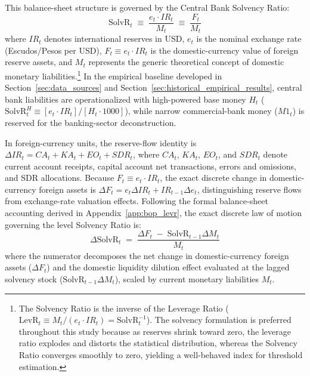 This balance-sheet structure is governed by the Central Bank Solvency Ratio:
\begin{equation}
	\text{SolvR}_t \;\equiv\; \frac{e_t \cdot IR_t}{M_t} \;\equiv\; \frac{F_t}{M_t}
	\label{eq:solvency_ratio}
\end{equation}
where $IR_t$ denotes international reserves in USD, $e_t$ is the nominal exchange rate (Escudos/Pesos per USD), $F_t \equiv e_t \cdot IR_t$ is the domestic-currency value of foreign reserve assets, and $M_t$ represents the generic theoretical concept of domestic monetary liabilities.\footnote{The Solvency Ratio is the inverse of the Leverage Ratio ($\text{LevR}_t \equiv M_t / (e_t \cdot IR_t) = \text{SolvR}_t^{-1}$). The solvency formulation is preferred throughout this study because as reserves shrink toward zero, the leverage ratio explodes and distorts the statistical distribution, whereas the Solvency Ratio converges smoothly to zero, yielding a well-behaved index for threshold estimation.} In the empirical baseline developed in Section~\ref{sec:data_sources} and Section~\ref{sec:historical_empirical_results}, central bank liabilities are operationalized with high-powered base money $H_t$ ($\text{SolvR}^H_t \equiv [e_t \cdot IR_t] / [H_t \cdot 1000]$), while narrow commercial-bank money ($M1_t$) is reserved for the banking-sector deconstruction.

In foreign-currency units, the reserve-flow identity is $\Delta IR_t = CA_t + KA_t + EO_t + SDR_t$, where $CA_t$, $KA_t$, $EO_t$, and $SDR_t$ denote current account receipts, capital account net transactions, errors and omissions, and SDR allocations. Because $F_t \equiv e_t \cdot IR_t$, the exact discrete change in domestic-currency foreign assets is $\Delta F_t = e_t \Delta IR_t + IR_{t-1} \Delta e_t$, distinguishing reserve flows from exchange-rate valuation effects. Following the formal balance-sheet accounting derived in Appendix~\ref{app:bop_levr}, the exact discrete law of motion governing the level Solvency Ratio is:
\begin{equation}
	\Delta \text{SolvR}_t \;=\; \frac{\Delta F_t \;-\; \text{SolvR}_{t-1} \Delta M_t}{M_t}
	\label{eq:solvency_law_motion}
\end{equation}
where the numerator decomposes the net change in domestic-currency foreign assets ($\Delta F_t$) and the domestic liquidity dilution effect evaluated at the lagged solvency stock ($\text{SolvR}_{t-1} \Delta M_t$), scaled by current monetary liabilities $M_t$.

